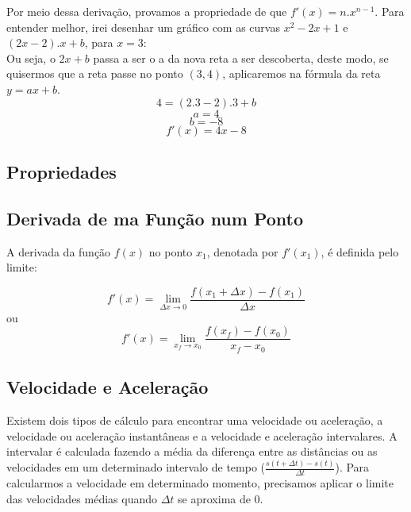 \documentclass[ ]{article}
\begin{document}
	Por meio dessa derivação, provamos a propriedade de que $f'(x) = n.x^{n-1}$.
	\newpage
	Para entender melhor, irei desenhar um gráfico com as curvas $x^2-2x+1$ e $(2x-2).x+b$, para $x=3$:\\
	Ou seja, o $2x+b$ passa a ser o a da nova reta a ser descoberta, deste modo, se quisermos que a reta passe no ponto $(3,4)$, aplicaremos na fórmula da reta $y = ax+b$.
	$$4 = (2.3-2).3 + b$$
	$$a = 4$$ $$b=-8$$
	$$f'(x) = 4x - 8$$
	
	
	\subsection{Propriedades}
	
	\subsection{Derivada de ma Função num Ponto}
		A derivada da função $f(x)$ no ponto $x_1$, denotada por $f'(x_1)$, é definida pelo limite:
		
		$$f'(x) = \lim_{\Delta x\to 0} \dfrac{f(x_1+\Delta x)-f(x_1)}{\Delta x}$$
		ou
		$$f'(x) = \lim_{x_f\to x_0}\dfrac{f(x_f)-f(x_0)}{x_f-x_0}$$		
	\subsection{Velocidade e Aceleração}
		Existem dois tipos de cálculo para encontrar uma velocidade ou aceleração, a velocidade ou aceleração instantâneas e a velocidade e aceleração intervalares. A intervalar é calculada fazendo a média da diferença entre as distâncias ou as velocidades em um determinado intervalo de tempo ($\frac{s(t+\Delta t)-s(t)}{\Delta t}$). Para calcularmos a velocidade em determinado momento, precisamos aplicar o limite das velocidades médias quando $\Delta t$ se aproxima de 0.
		
\end{document}
